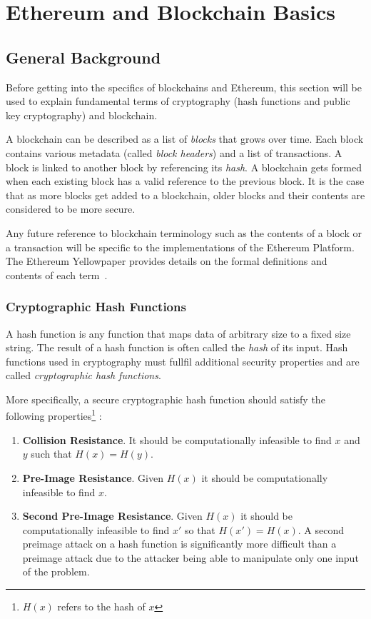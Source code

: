 \chapter{Ethereum and Blockchain Basics}\label{ch:basics}

\section{General Background}
Before getting into the specifics of blockchains and Ethereum, this section will be used to explain fundamental terms of cryptography (hash functions and public key cryptography) and blockchain.

A blockchain can be described as a list of \textit{blocks} that grows over time. Each block contains various metadata (called \textit{block headers}) and a list of transactions. A block is linked to another block by referencing its \textit{hash}. A blockchain gets formed when each existing block has a valid reference to the previous block. It is the case that as more blocks get added to a blockchain, older blocks and their contents are considered to be more secure.

Any future reference to blockchain terminology such as the contents of a block or a transaction will be specific to the implementations of the Ethereum Platform. The Ethereum Yellowpaper provides details on the formal definitions and contents of each term~\cite{ethereum}.

\subsection{Cryptographic Hash Functions}
A hash function is any function that maps data of arbitrary size to a fixed size string. The result of a hash function is often called the \textit{hash} of its input. Hash functions used in cryptography must fullfil additional security properties and are called \textit{cryptographic hash functions}.

More specifically, a secure cryptographic hash function should satisfy the following properties\footnote{\(H(x)\) refers to the hash of $x$} \cite{Rogaway04cryptographichash-function}:
\begin{enumerate}
   \item \textbf{Collision Resistance}. It should be computationally infeasible to find $x$ and $y$ such that \(H(x) = H(y)\). 
   \item \textbf{Pre-Image Resistance}. Given \(H(x)\) it should be computationally infeasible to find \(x\).
   \item \textbf{Second Pre-Image Resistance}. Given \(H(x)\) it should be computationally infeasible to find \(x'\) so that \(H(x') = H(x)\). A second preimage attack on a hash function is significantly more difficult than a preimage attack due to the attacker being able to manipulate only one input of the problem. 
\end{enumerate}

